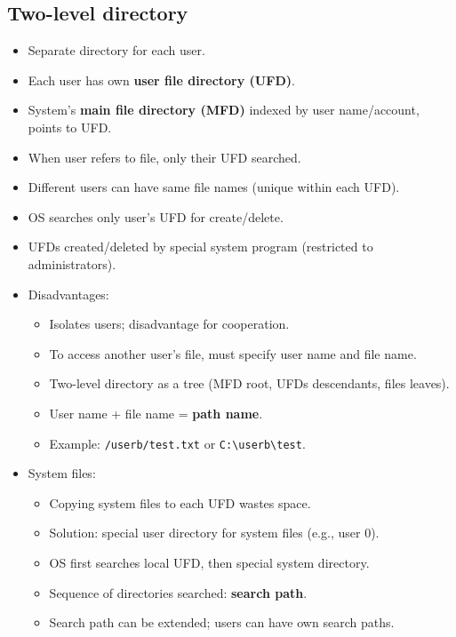 \subsection{Two-level directory}
\begin{itemize}
    \item Separate directory for each user.
    \item Each user has own \textbf{user file directory (UFD)}.
    \item System's \textbf{main file directory (MFD)} indexed by user name/account, points to UFD.
    \item When user refers to file, only their UFD searched.
    \item Different users can have same file names (unique within each UFD).
    \item OS searches only user's UFD for create/delete.
    \item UFDs created/deleted by special system program (restricted to administrators).
    \item Disadvantages:
    \begin{itemize}
        \item Isolates users; disadvantage for cooperation.
        \item To access another user's file, must specify user name and file name.
        \item Two-level directory as a tree (MFD root, UFDs descendants, files leaves).
        \item User name + file name = \textbf{path name}.
        \item Example: \texttt{/userb/test.txt} or \texttt{C:\textbackslash{}userb\textbackslash{}test}.
    \end{itemize}
    \item System files:
    \begin{itemize}
        \item Copying system files to each UFD wastes space.
        \item Solution: special user directory for system files (e.g., user 0).
        \item OS first searches local UFD, then special system directory.
        \item Sequence of directories searched: \textbf{search path}.
        \item Search path can be extended; users can have own search paths.
    \end{itemize}
\end{itemize}

